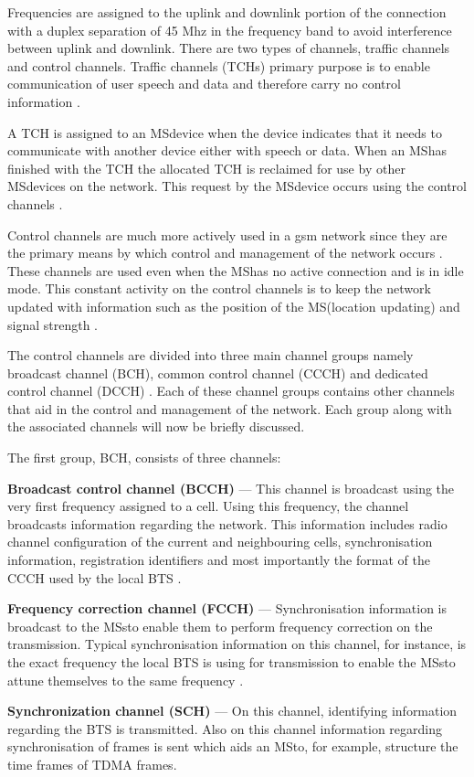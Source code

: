 Frequencies are assigned to the uplink and downlink portion of the connection with a duplex separation of 45 Mhz in the frequency band to avoid interference between uplink and downlink. There are two types of channels, traffic channels and control channels. Traffic channels (TCHs) primary purpose is to enable communication of user speech and data and therefore carry no control information \cite{GSMArchitectureProtocolsServices}.

A TCH is assigned to an \gls{MS}device when the device indicates that it needs to communicate with another device either with speech or data. When an \gls{MS}has finished with the TCH the allocated TCH is reclaimed for use by other \gls{MS}devices on the network. This request by the \gls{MS}device occurs using the control channels \cite{GSMArchitectureProtocolsServices}.

Control channels are much more actively used in a \gls{gsm} network since they are the primary means by which control and management of the network occurs \cite{GSMArchitectureProtocolsServices}. These channels are used even when the \gls{MS}has no active connection and is in idle mode. This constant activity on the control channels is to keep the network updated with information such as the position of the \gls{MS}(location updating) and signal strength \cite{GSMArchitectureProtocolsServices,GSMSysEngin,Eisenblatter}. 

The control channels are divided into three main channel groups namely broadcast channel (BCH), common control channel (CCCH) and dedicated control channel (DCCH) \cite{GSMArchitectureProtocolsServices}. Each of these channel groups contains other channels that aid in the control and management of the network. Each group along with the associated channels will now be briefly discussed.

The first group, BCH, consists of three channels:
\begin{description}
\item{\textbf{Broadcast control channel (BCCH)}} --- This channel is broadcast using the very first frequency assigned to a cell. Using this frequency, the channel broadcasts information regarding the network. This information includes radio channel configuration of the current and neighbouring cells, synchronisation information, registration identifiers and most importantly the format of the CCCH used by the local BTS \cite{GSMArchitectureProtocolsServices}.
\item{\textbf{Frequency correction channel (FCCH)}} --- Synchronisation information is broadcast to the \glspl{MS}to enable them to perform frequency correction on the transmission. Typical synchronisation information on this channel, for instance, is the exact frequency the local BTS is using for transmission to enable the \glspl{MS}to attune themselves to the same frequency \cite{GSMArchitectureProtocolsServices}.
\item{\textbf{Synchronization channel (SCH)}} --- On this channel, identifying information regarding the BTS is transmitted. Also on this channel information regarding synchronisation of frames is sent which aids an \gls{MS}to, for example, structure the time frames of \gls{TDMA} frames.
\end{description}

